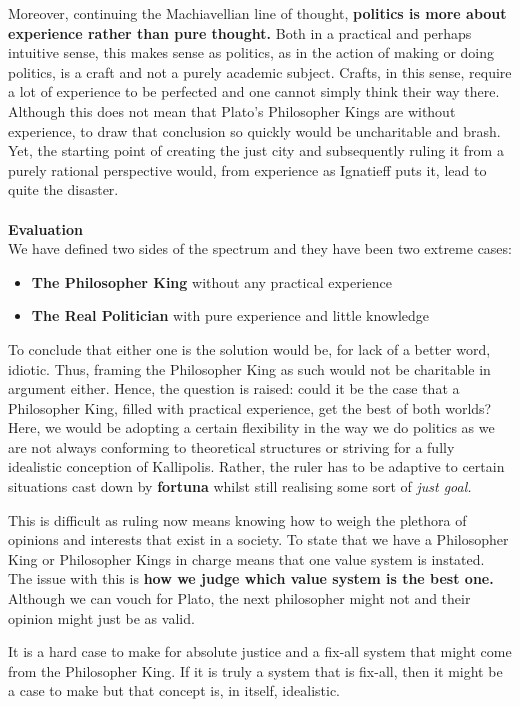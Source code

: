 \documentclass[12pt, letterpaper]{article}
\begin{document}
Moreover, continuing the Machiavellian line of thought, \textbf{politics is more about experience rather than pure thought.} Both in a practical and perhaps intuitive sense, this makes sense as politics, as in the action of making or doing politics, is a craft and not a purely academic subject. Crafts, in this sense, require a lot of experience to be perfected and one cannot simply think their way there. Although this does not mean that Plato's Philosopher Kings are without experience, to draw that conclusion so quickly would be uncharitable and brash. Yet, the starting point of creating the just city and subsequently ruling it from a purely rational perspective would, from experience as Ignatieff puts it, lead to quite the disaster.\\\\
\textbf{Evaluation}\\
We have defined two sides of the spectrum and they have been two extreme cases:
\begin{itemize}
	\item \textbf{The Philosopher King} without any practical experience
	\item \textbf{The Real Politician} with pure experience and little knowledge
\end{itemize}
To conclude that either one is the solution would be, for lack of a better word, idiotic. Thus, framing the Philosopher King as such would not be charitable in argument either. Hence, the question is raised: could it be the case that a Philosopher King, filled with practical experience, get the best of both worlds? Here, we would be adopting a certain flexibility in the way we do politics as we are not always conforming to theoretical structures or striving for a fully idealistic conception of Kallipolis. Rather, the ruler has to be adaptive to certain situations cast down by \textbf{fortuna} whilst still realising some sort of \textit{just goal.}

This is difficult as ruling now means knowing how to weigh the plethora  of opinions and interests that exist in a society. To state that we have a Philosopher King or Philosopher Kings in charge means that one value system is instated. The issue with this is \textbf{how we judge which value system is the best one.} Although we can vouch for Plato, the next philosopher might not and their opinion might just be as valid.

It is a hard case to make for absolute justice and a fix-all system that might come from the Philosopher King. If it is truly a system that is fix-all, then it might be a case to make but that concept is, in itself, idealistic.
\end{document}
